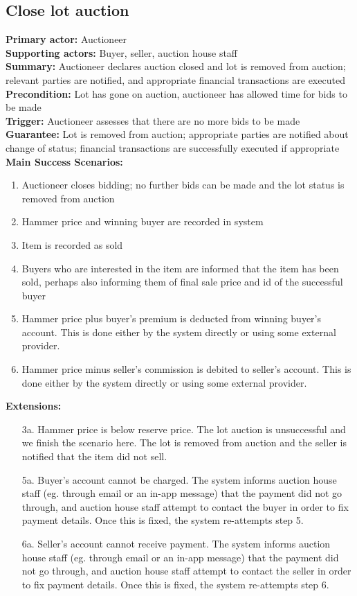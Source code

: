 \documentclass[titlepage, 12pt]{extarticle}
\begin{document}
\subsection{Close lot auction}
{\bf Primary actor: } Auctioneer 
\\{\bf Supporting actors: } Buyer, seller, auction house staff
\\{\bf Summary: } Auctioneer declares auction closed and lot is removed from auction; relevant parties are notified, and appropriate financial transactions are executed
\\{\bf Precondition: } Lot has gone on auction, auctioneer has allowed time for bids to be made
\\{\bf Trigger: } Auctioneer assesses that there are no more bids to be made
\\{\bf Guarantee: } Lot is removed from auction; appropriate parties are notified about change of status; financial transactions are successfully executed if appropriate
\\{\bf Main Success Scenarios: }
\begin{enumerate}
\item Auctioneer closes bidding; no further bids can be made and the lot status is removed from auction
\item Hammer price and winning buyer are recorded in system
\item Item is recorded as sold
\item Buyers who are interested in the item are informed that the item has been sold, perhaps also informing them of final sale price and id of the successful buyer
\item Hammer price plus buyer's premium is deducted from winning buyer's account. This is done either by the system directly or using some external provider. 
\item Hammer price minus seller's commission is debited to seller's account. This is done either by the system directly or using some external provider. 
\end{enumerate}
{\bf Extensions: }
\begin{itemize}
\item [3a.] Hammer price is below reserve price. The lot auction is unsuccessful and we finish the scenario here. The lot is removed from auction and the seller is notified that the item did not sell. 
\item [5a.] Buyer's account cannot be charged.  The system informs auction house staff (eg. through email or an in-app message) that the payment did not go through, and auction house staff attempt to contact the buyer in order to fix payment details. Once this is fixed, the system re-attempts step 5. 
\item [6a.] Seller's account cannot receive payment. The system informs auction house staff (eg. through email or an in-app message) that the payment did not go through, and auction house staff attempt to contact the seller in order to fix payment details. Once this is fixed, the system re-attempts step 6. 
\end{itemize}
\end{document}
